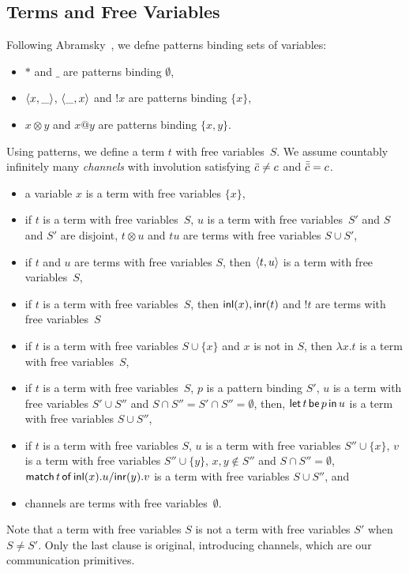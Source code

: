 \subsection{Terms and Free Variables}

Following Abramsky~\citep{abramsky1993computational}, we defne patterns
binding sets of
variables:
\begin{itemize}
 \item $\ast$ and $\_$ are patterns binding $\emptyset$,
 \item $\langle{x,\_}\rangle$, $\langle{\_,x}\rangle$ and $!x$ are patterns binding
       $\{x\}$,
 \item $x\otimes y$ and $x@y$ are patterns binding $\{x,y\}$.
\end{itemize}
Using patterns, we define a term $t$ with free variables~$S$.
We assume countably infinitely many \textit{channels}
with involution
satisfying $\bar{c}\neq c$ and $\bar{\bar{c}} = c$.
\begin{itemize}
 \item a variable $x$ is a term with free variables $\{x\}$,
 \item if $t$ is a term with free variables~$S$, $u$ is a term with
       free variables~$S'$ and $S$ and $S'$ are disjoint, $t\otimes u$ and
       $tu$ are terms with free variables $S\cup S'$,
 \item if $t$ and $u$ are terms with free variables $S$, then
       $\langle{t,u}\rangle$ is a term with free variables~$S$,
 \item if $t$ is a term with free variables~$S$, then
       $\mathsf{inl}({x}), \mathsf{inr}({t})$ and $!t$ are terms with free variables~$S$
 \item if $t$ is a term with free variables $S\cup \{x\}$ and $x$ is not
       in $S$, then $\lambda x.t$ is a term with free variables~$S$,
 \item if $t$ is a term with free variables~$S$, $p$ is a pattern
       binding $S'$, $u$ is a term with free variables $S'\cup S''$ and
       $S\cap S'' = S'\cap S'' = \emptyset$, then,
       $\mathsf{let }\,{t}\,\mathsf{ be }\,{p}\,\mathsf{ in }\,{u}$ is a term with free variables $S\cup S''$,
 \item if $t$ is a term with free variables $S$,
       $u$ is a term with free variables $S''\cup \{x\}$,
       $v$ is a term with free variables $S''\cup \{y\}$,
       $x,y\notin S''$ and $S\cap S'' = \emptyset$,
       $\mathsf{match}\,{t}\,\mathsf{of}\, \mathsf{inl}({x}). {u}/ \mathsf{inr}({y}). {v}$ is a term with free variables $S\cup S''$, and
 \item channels are terms with free variables~$\emptyset$.
\end{itemize}
Note that a term with free variables $S$ is not a term with free
variables $S'$ when $S\neq S'$.  Only the last clause is original,
introducing channels, which are our communication primitives.

